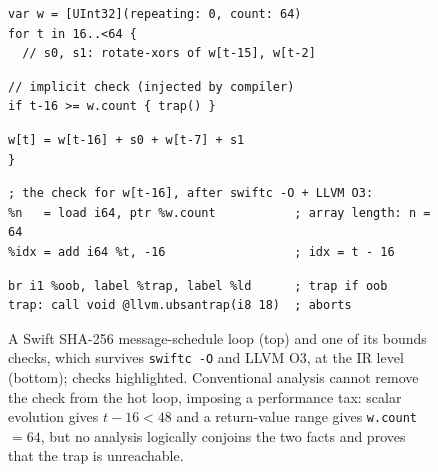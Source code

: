 \documentclass[acmsmall,screen,nonacm]{acmart}
\newlength{\chkcw}\newlength{\chkpad}
\newenvironment{chkbox}[2]{\par\vspace{1pt}\raggedright\noindent
  \hspace*{\dimexpr 0.5em+#1\chkcw-\chkpad\relax}%
  \tcolorbox[nobeforeafter, colback=checkpink, colframe=checkpink,
    boxrule=0pt, arc=3pt, boxsep=0pt, left=\chkpad, right=\chkpad,
    top=1.5pt, bottom=1.5pt, width=\dimexpr #2\chkcw+2\chkpad\relax]}%
  {\endtcolorbox\par\vspace{1pt}}
\begin{document}
\begin{figure}[t]
\centering
\begin{minipage}[t]{\linewidth}
\begin{lstlisting}[style=odessy,
    morekeywords={var,for,in,let,if},
    comment={[l]{//}}]
var w = [UInt32](repeating: 0, count: 64)
for t in 16..<64 {
  // s0, s1: rotate-xors of w[t-15], w[t-2]
\end{lstlisting}
\begin{chkbox}{2}{40}
\begin{lstlisting}[style=odessy, xleftmargin=0pt,
    morekeywords={var,for,in,let,if},
    comment={[l]{//}}]
// implicit check (injected by compiler)
if t-16 >= w.count { trap() }
\end{lstlisting}
\end{chkbox}
\begin{lstlisting}[style=odessy,
    morekeywords={var,for,in,let,if},
    comment={[l]{//}}]
  w[t] = w[t-16] + s0 + w[t-7] + s1
}
\end{lstlisting}
\end{minipage}\par\vspace{0.7em}
\begin{minipage}[t]{\linewidth}
\begin{lstlisting}[style=odessy,
    morekeywords={load,add,icmp,uge,br,label,call,void,i8,i64,i1,ptr},
    comment={[l]{;}}]
; the check for w[t-16], after swiftc -O + LLVM O3:
%n   = load i64, ptr %w.count           ; array length: n = 64
%idx = add i64 %t, -16                  ; idx = t - 16
\end{lstlisting}
\begin{chkbox}{0}{58}
\begin{lstlisting}[style=odessy, xleftmargin=0pt,
    morekeywords={load,add,icmp,uge,br,label,call,void,i8,i64,i1,ptr},
    comment={[l]{;}}]
%oob = icmp uge i64 %idx, %n            ; oob = (idx >= n)
br i1 %oob, label %trap, label %ld      ; trap if oob
trap: call void @llvm.ubsantrap(i8 18)  ; aborts
\end{lstlisting}
\end{chkbox}
\end{minipage}
\caption{A Swift SHA-256 message-schedule loop (top) and one of its
bounds checks, which survives \texttt{swiftc -O} and LLVM O3, at the IR
level (bottom); checks highlighted. Conventional analysis cannot remove
the check from the hot loop, imposing a performance tax: scalar
evolution gives $t - 16 < 48$ and a return-value range gives
\texttt{w.count} $= 64$, but no analysis logically conjoins the two facts and
proves that the trap is unreachable.}
\label{fig:simple-example}
\end{figure}
\end{document}
